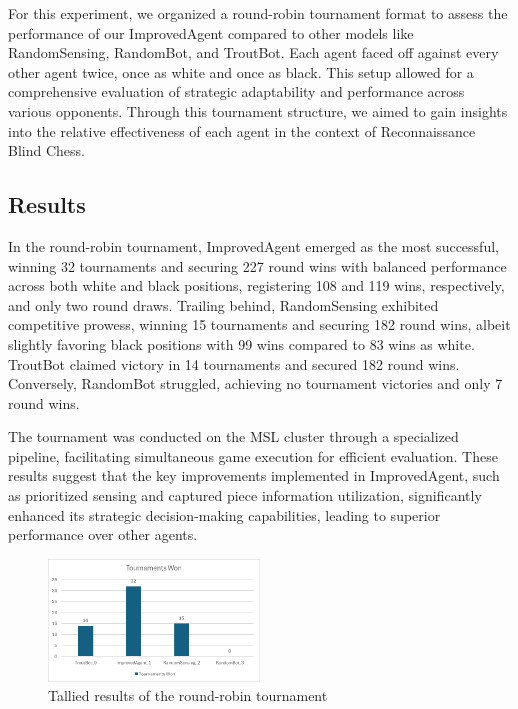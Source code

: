 \documentclass[10pt]{article}
\begin{document}
For this experiment, we organized a round-robin tournament format to assess the performance of our ImprovedAgent compared to other models like RandomSensing, RandomBot, and TroutBot. Each agent faced off against every other agent twice, once as white and once as black. This setup allowed for a comprehensive evaluation of strategic adaptability and performance across various opponents. Through this tournament structure, we aimed to gain insights into the relative effectiveness of each agent in the context of Reconnaissance Blind Chess.

\subsection{Results}

In the round-robin tournament, ImprovedAgent emerged as the most successful, winning 32 tournaments and securing 227 round wins with balanced performance across both white and black positions, registering 108 and 119 wins, respectively, and only two round draws. Trailing behind, RandomSensing exhibited competitive prowess, winning 15 tournaments and securing 182 round wins, albeit slightly favoring black positions with 99 wins compared to 83 wins as white. TroutBot claimed victory in 14 tournaments and secured 182 round wins. Conversely, RandomBot struggled, achieving no tournament victories and only 7 round wins. 

The tournament was conducted on the MSL cluster through a specialized pipeline, facilitating simultaneous game execution for efficient evaluation. These results suggest that the key improvements implemented in ImprovedAgent, such as prioritized sensing and captured piece information utilization, significantly enhanced its strategic decision-making capabilities, leading to superior performance over other agents.

\begin{figure}[H]
\centering
\includegraphics[width=0.5\textwidth]{tournamentTotal.png}
\caption{Tallied results of the round-robin tournament}
\label{fig:tournamentTotal}
\end{figure}
\end{document}
